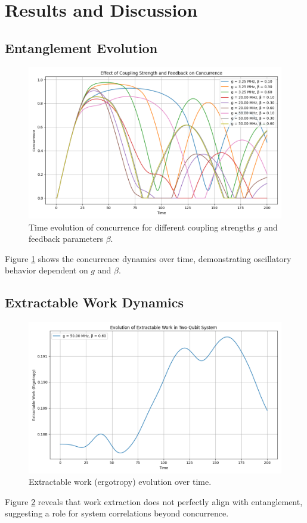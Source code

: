 \documentclass[a4paper,12pt]{article}
\begin{document}
\section{Results and Discussion}
\subsection{Entanglement Evolution}
\begin{figure}[h]
\centering
\includegraphics[width=0.7\linewidth]{Figure1.png}
\caption{Time evolution of concurrence for different coupling strengths $g$ and feedback parameters $\beta$.}
\label{fig:concurrence}
\end{figure}

Figure \ref{fig:concurrence} shows the concurrence dynamics over time, demonstrating oscillatory behavior 
dependent on $g$ and $\beta$.

\subsection{Extractable Work Dynamics}
\begin{figure}[h]
\centering
\includegraphics[width=0.7\linewidth]{Figure2.png}
\caption{Extractable work (ergotropy) evolution over time.}
\label{fig:ergotropy}
\end{figure}

Figure \ref{fig:ergotropy} reveals that work extraction does not perfectly align with entanglement, 
suggesting a role for system correlations beyond concurrence.
\end{document}
